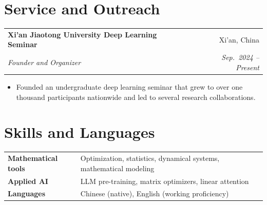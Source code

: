 \documentclass[10pt,a4paper]{article}
\makeatletter
\newcommand{\entry}[4]{%
  \begin{tabular*}{\textwidth}{@{}p{0.735\textwidth}@{\extracolsep{\fill}}r@{}}
    \textbf{#1} & #2 \\
    \textit{#3} & \textit{#4} \\
  \end{tabular*}%
  \vspace{0.18em}%
}
\newenvironment{details}
  {\begin{itemize}[leftmargin=1.1em,topsep=0.05em,itemsep=0.02em,parsep=0pt,label=\textendash]}
  {\end{itemize}\vspace{0.16em}}
\makeatother
\begin{document}
\section*{Service and Outreach}
\entry{Xi'an Jiaotong University Deep Learning Seminar}{Xi'an, China}
      {Founder and Organizer}{Sep.\ 2024 -- Present}
\vspace{-0.35em}
\begin{details}
  \item Founded an undergraduate deep learning seminar that grew to over one thousand participants
        nationwide and led to several research collaborations.
\end{details}

\section*{Skills and Languages}
\begin{tabular}{@{}p{}@{}p{}@{}}
  \textbf{Mathematical tools} & Optimization, statistics, dynamical systems, mathematical modeling \\
  \textbf{Applied AI}         & LLM pre-training, matrix optimizers, linear attention \\
  \textbf{Languages}          & Chinese (native), English (working proficiency) \\
\end{tabular}
\end{document}
